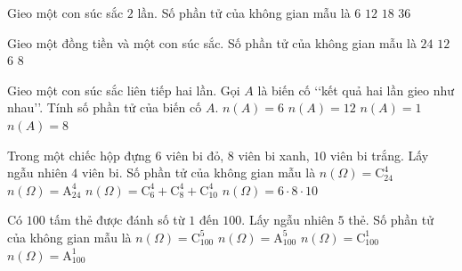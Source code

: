 \begin{ex}%
	Gieo một con súc sắc $2$ lần. Số phần tử  của không gian mẫu là
	\choice 
		 {$6$}
		 {$12$}
		 {$18$}
		{\True $36$} 
\end{ex}

\begin{ex}%
	Gieo một đồng tiền và một con súc sắc. Số  phần tử của không gian mẫu là
	 \choice
		 {$24$}
		{\True  $12$}
		{$6$} 
		 {$8$}
\end{ex}

\begin{ex}%
	Gieo một con súc sắc liên tiếp hai lần. Gọi $A$ là biến cố \lq\lq kết quả hai lần gieo như nhau\rq\rq. Tính số phần tử  của biến cố $A$.
	 \choice
		 {\True $n(A)=6$}
		 {$n(A)=12$}
		{$n(A)=1$} 
		{$n(A)=8$} 
\end{ex}

\begin{ex}%
	 Trong một chiếc hộp đựng $6$ viên bi đỏ, $8$ viên bi xanh, $10$ viên bi trắng. Lấy ngẫu nhiên $4$ viên bi. Số phần tử của không gian mẫu là
	\choice 
		{\True $n(\Omega) =  \mathrm{C}_{24}^{4}$}
		{$n(\Omega)  = \mathrm{A}_{24}^{4}$}
		{$n(\Omega) = \mathrm{C}_{6}^{4} + \mathrm{C}_{8}^{4} +  \mathrm{C}_{10}^{4}$}
		 {$n(\Omega) = 6\cdot 8\cdot 10$}
\end{ex}

\begin{ex}%
	Có $100$ tấm thẻ được đánh số từ $1$ đến $100$. Lấy ngẫu nhiên $5$ thẻ. Số phần tử của không gian  mẫu là
	 \choice
		{\True $n(\Omega) =  \mathrm{C}_{100}^{5}$}
		{$n(\Omega) =  \mathrm{A}_{100}^{5}$}
		{$n(\Omega)  = \mathrm{C}_{100}^{1}$}
		{$n(\Omega) = \mathrm{A}_{100}^{1}$} 
\end{ex}

